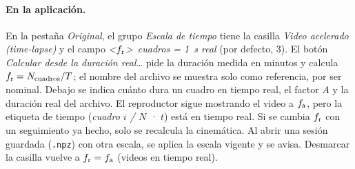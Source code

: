 \paragraph{En la aplicación.} En la pestaña \emph{Original}, el grupo \emph{Escala de tiempo}
tiene la casilla \emph{Video acelerado (time-lapse)} y el campo
\emph{\textless$f_{\mathrm{r}}$\textgreater~cuadros = 1~s real} (por defecto, 3). El botón \emph{Calcular desde la
duración real\ldots} pide la duración medida en minutos y calcula $f_{\mathrm{r}} = N_{\mathrm{cuadros}}/T$; el
nombre del archivo se muestra solo como referencia, por ser nominal. Debajo se indica cuánto dura
un cuadro en tiempo real, el factor $A$ y la duración real del archivo. El reproductor sigue
mostrando el video a $f_{\mathrm{a}}$, pero la etiqueta de tiempo (\emph{cuadro $i$ / $N$ · $t$}) está en
tiempo real. Si se cambia $f_{\mathrm{r}}$ con un seguimiento ya hecho, solo se recalcula la cinemática. Al
abrir una sesión guardada (\texttt{.npz}) con otra escala, se aplica la escala vigente y se avisa.
Desmarcar la casilla vuelve a $f_{\mathrm{r}} = f_{\mathrm{a}}$ (videos en tiempo real).

